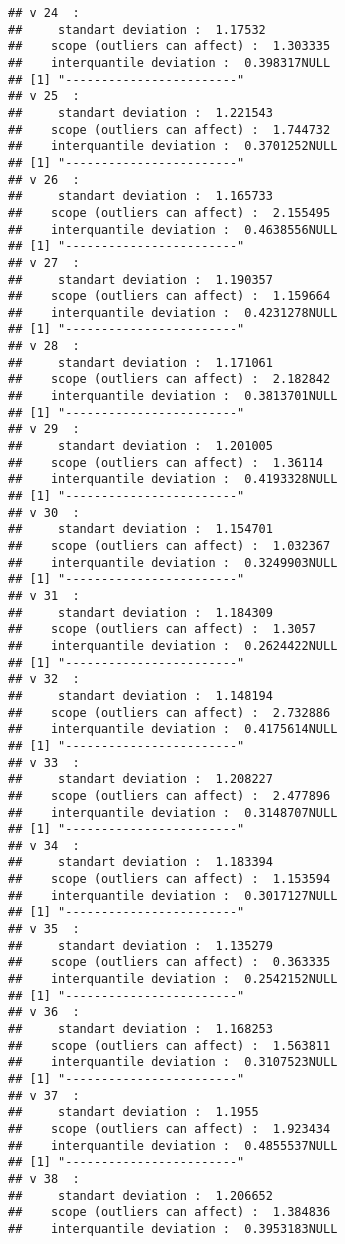\documentclass[]{article}
\begin{document}
\begin{verbatim}
## v 24  : 
##     standart deviation :  1.17532 
##    scope (outliers can affect) :  1.303335 
##    interquantile deviation :  0.398317NULL
## [1] "------------------------"
## v 25  : 
##     standart deviation :  1.221543 
##    scope (outliers can affect) :  1.744732 
##    interquantile deviation :  0.3701252NULL
## [1] "------------------------"
## v 26  : 
##     standart deviation :  1.165733 
##    scope (outliers can affect) :  2.155495 
##    interquantile deviation :  0.4638556NULL
## [1] "------------------------"
## v 27  : 
##     standart deviation :  1.190357 
##    scope (outliers can affect) :  1.159664 
##    interquantile deviation :  0.4231278NULL
## [1] "------------------------"
## v 28  : 
##     standart deviation :  1.171061 
##    scope (outliers can affect) :  2.182842 
##    interquantile deviation :  0.3813701NULL
## [1] "------------------------"
## v 29  : 
##     standart deviation :  1.201005 
##    scope (outliers can affect) :  1.36114 
##    interquantile deviation :  0.4193328NULL
## [1] "------------------------"
## v 30  : 
##     standart deviation :  1.154701 
##    scope (outliers can affect) :  1.032367 
##    interquantile deviation :  0.3249903NULL
## [1] "------------------------"
## v 31  : 
##     standart deviation :  1.184309 
##    scope (outliers can affect) :  1.3057 
##    interquantile deviation :  0.2624422NULL
## [1] "------------------------"
## v 32  : 
##     standart deviation :  1.148194 
##    scope (outliers can affect) :  2.732886 
##    interquantile deviation :  0.4175614NULL
## [1] "------------------------"
## v 33  : 
##     standart deviation :  1.208227 
##    scope (outliers can affect) :  2.477896 
##    interquantile deviation :  0.3148707NULL
## [1] "------------------------"
## v 34  : 
##     standart deviation :  1.183394 
##    scope (outliers can affect) :  1.153594 
##    interquantile deviation :  0.3017127NULL
## [1] "------------------------"
## v 35  : 
##     standart deviation :  1.135279 
##    scope (outliers can affect) :  0.363335 
##    interquantile deviation :  0.2542152NULL
## [1] "------------------------"
## v 36  : 
##     standart deviation :  1.168253 
##    scope (outliers can affect) :  1.563811 
##    interquantile deviation :  0.3107523NULL
## [1] "------------------------"
## v 37  : 
##     standart deviation :  1.1955 
##    scope (outliers can affect) :  1.923434 
##    interquantile deviation :  0.4855537NULL
## [1] "------------------------"
## v 38  : 
##     standart deviation :  1.206652 
##    scope (outliers can affect) :  1.384836 
##    interquantile deviation :  0.3953183NULL

\end{verbatim}
\end{document}
